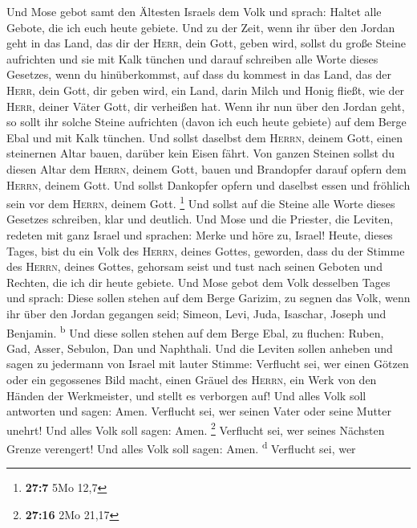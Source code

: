  Und Mose gebot samt den Ältesten Israels dem Volk und
sprach: Haltet alle Gebote, die ich euch heute gebiete. 
Und zu der Zeit, wenn ihr über den Jordan geht in das Land, das dir der
\textsc{Herr}, dein Gott, geben wird, sollst du große Steine aufrichten
und sie mit Kalk tünchen  und darauf schreiben alle Worte
dieses Gesetzes, wenn du hinüberkommst, auf dass du kommest in das Land,
das der \textsc{Herr}, dein Gott, dir geben wird, ein Land, darin Milch
und Honig fließt, wie der \textsc{Herr}, deiner Väter Gott, dir
verheißen hat.  Wenn ihr nun über den Jordan geht, so
sollt ihr solche Steine aufrichten (davon ich euch heute gebiete) auf
dem Berge Ebal und mit Kalk tünchen.  Und sollst daselbst
dem \textsc{Herrn}, deinem Gott, einen steinernen Altar bauen, darüber
kein Eisen fährt.  Von ganzen Steinen sollst du diesen
Altar dem \textsc{Herrn}, deinem Gott, bauen und Brandopfer darauf
opfern dem \textsc{Herrn}, deinem Gott.  Und sollst
Dankopfer opfern und daselbst essen und fröhlich sein vor dem
\textsc{Herrn}, deinem Gott. \footnote{\textbf{27:7} 5Mo 12,7}
 Und sollst auf die Steine alle Worte dieses Gesetzes
schreiben, klar und deutlich.  Und Mose und die Priester,
die Leviten, redeten mit ganz Israel und sprachen: Merke und höre zu,
Israel! Heute, dieses Tages, bist du ein Volk des \textsc{Herrn}, deines
Gottes, geworden,  dass du der Stimme des \textsc{Herrn},
deines Gottes, gehorsam seist und tust nach seinen Geboten und Rechten,
die ich dir heute gebiete.  Und Mose gebot dem Volk
desselben Tages und sprach:  Diese sollen stehen auf dem
Berge Garizim, zu segnen das Volk, wenn ihr über den Jordan gegangen
seid; Simeon, Levi, Juda, Isaschar, Joseph und Benjamin.
\textsuperscript{b}  Und diese sollen stehen auf dem
Berge Ebal, zu fluchen: Ruben, Gad, Asser, Sebulon, Dan und Naphthali.
 Und die Leviten sollen anheben und sagen zu jedermann
von Israel mit lauter Stimme:  Verflucht sei, wer einen
Götzen oder ein gegossenes Bild macht, einen Gräuel des \textsc{Herrn},
ein Werk von den Händen der Werkmeister, und stellt es verborgen auf!
Und alles Volk soll antworten und sagen: Amen.  Verflucht
sei, wer seinen Vater oder seine Mutter unehrt! Und alles Volk soll
sagen: Amen. \footnote{\textbf{27:16} 2Mo 21,17} 
Verflucht sei, wer seines Nächsten Grenze verengert! Und alles Volk soll
sagen: Amen. \textsuperscript{d}  Verflucht sei, wer
